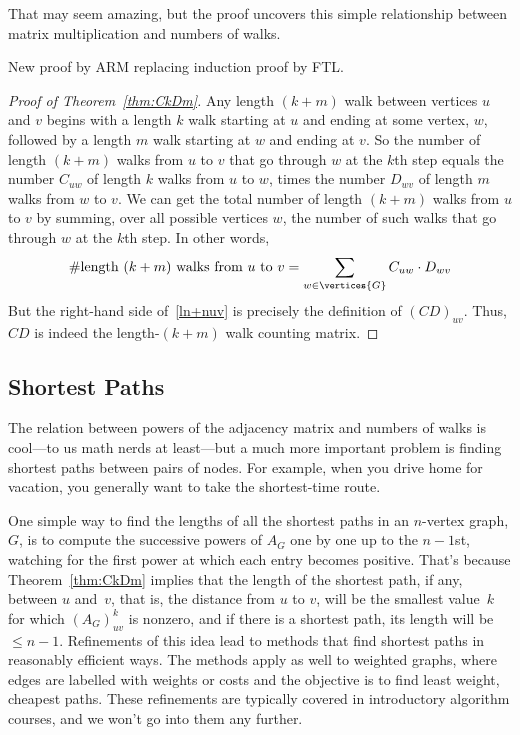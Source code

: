 That may seem amazing, but the proof uncovers this simple relationship
between matrix multiplication and numbers of walks.

\begin{editingnotes}
New proof by ARM replacing induction proof by FTL.
\end{editingnotes}

\begin{proof}[Proof of Theorem~\ref{thm:CkDm}]
  Any length $(k+m)$ walk between vertices $u$ and $v$ begins with a
  length $k$ walk starting at $u$ and ending at some vertex, $w$,
  followed by a length $m$ walk starting at $w$ and ending at $v$.  So
  the number of length $(k+m)$ walks from $u$ to $v$ that go through
  $w$ at the $k$th step equals the number $C_{uw}$ of length $k$ walks
  from $u$ to $w$, times the number $D_{wv}$ of length $m$ walks from
  $w$ to $v$.  We can get the total number of length $(k+m)$ walks
  from $u$ to $v$ by summing, over all possible vertices $w$, the
  number of such walks that go through $w$ at the $k$th step.  In
  other words,
\begin{equation}\label{ln+nuv}
\text{\#length $(k+m)$ walks from $u$ to $v$} =
              \sum_{w \in \vertices{G}} C_{uw}\cdot D_{wv}
\end{equation}
But the right-hand side of~\eqref{ln+nuv} is precisely the definition of
$(CD)_{uv}$.  Thus, $CD$ is indeed the length-$(k+m)$ walk counting matrix.
\end{proof}


\subsection{Shortest Paths}
The relation between powers of the adjacency matrix and numbers of
walks is cool---to us math nerds at least---but a much more important
problem is finding  shortest paths between
pairs of nodes.  For example, when you drive home for vacation, you
generally want to take the shortest-time route.

One simple way to find the lengths of all the shortest paths in an
$n$-vertex graph, $G$, is to compute the successive powers of $A_G$
one by one up to the $n-1$st, watching for the first power at which
each entry becomes positive.  That's because Theorem~\ref{thm:CkDm}
implies that the length of the shortest path, if any, between $u$
and~$v$, that is, the distance from $u$ to $v$, will be the smallest
value~$k$ for which $(A_G)_{uv}^k$ is nonzero, and if there is a
shortest path, its length will be $\leq n-1$.  Refinements of this
idea lead to methods that find shortest paths in reasonably efficient
ways.  The methods apply as well to weighted graphs, where edges are
labelled with weights or costs and the objective is to find least
weight, cheapest paths.  These refinements are typically covered in
introductory algorithm courses, and we won't go into them any
further.

